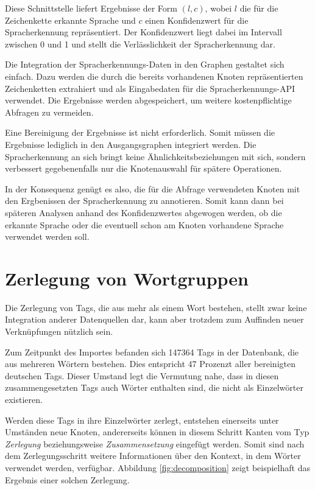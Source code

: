 Diese Schnittstelle liefert Ergebnisse der Form \((l, c)\), wobei \(l\) die für die Zeichenkette erkannte Sprache und \(c\) einen Konfidenzwert für die Spracherkennung repräsentiert. Der Konfidenzwert liegt dabei im Intervall zwischen \num{0} und \num{1} und stellt die Verlässlichkeit der Spracherkennung dar.

Die Integration der Spracherkennungs-Daten in den Graphen gestaltet sich einfach. Dazu werden die durch die bereits vorhandenen Knoten repräsentierten Zeichenketten extrahiert und als Eingabedaten für die Spracherkennungs-API verwendet. Die Ergebnisse werden abgespeichert, um weitere kostenpflichtige Abfragen zu vermeiden.

Eine Bereinigung der Ergebnisse ist nicht erforderlich. Somit müssen die Ergebnisse lediglich in den Ausgangsgraphen integriert werden. Die Spracherkennung an sich bringt keine Ähnlichkeitsbeziehungen mit sich, sondern verbessert gegebenenfalls nur die Knotenauswahl für spätere Operationen.

In der Konsequenz genügt es also, die für die Abfrage verwendeten Knoten mit den Ergbenissen der Spracherkennung zu annotieren. Somit kann dann bei späteren Analysen anhand des Konfidenzwertes abgewogen werden, ob die erkannte Sprache oder die eventuell schon am Knoten vorhandene Sprache verwendet werden soll.

\section{Zerlegung von Wortgruppen}

Die Zerlegung von Tags, die aus mehr als einem Wort bestehen, stellt zwar keine Integration anderer Datenquellen dar, kann aber trotzdem zum Auffinden neuer Verknüpfungen nützlich sein.

Zum Zeitpunkt des Importes befanden sich \num{147364} Tags in der Datenbank, die aus mehreren Wörtern bestehen. Dies entspricht \num{47} Prozenzt aller bereinigten deutschen Tags. Dieser Umstand legt die Vermutung nahe, dass in diesen zusammengesetzten Tags auch Wörter enthalten sind, die nicht als Einzelwörter existieren.

Werden diese Tags in ihre Einzelwörter zerlegt, entstehen einerseits unter Umständen neue Knoten, andererseits können in diesem Schritt Kanten vom Typ \emph{Zerlegung} beziehungsweise \emph{Zusammensetzung} eingefügt werden. Somit sind nach dem Zerlegungsschritt weitere Informationen über den Kontext, in dem Wörter verwendet werden, verfügbar. Abbildung \ref{fig:decomposition} zeigt beispielhaft das Ergebnis einer solchen Zerlegung.

